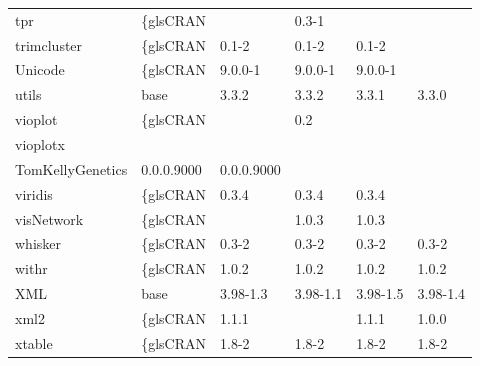 \begin{longtable}{llllll}
\rowcolor{black!10}
tpr                           & \{gls{CRAN}                      &             & 0.3-1       &                &                   \\
\rowcolor{black!5}
trimcluster                   & \{gls{CRAN}                      & 0.1-2       & 0.1-2       & 0.1-2          &                    \\
\rowcolor{black!10}
Unicode                       & \{gls{CRAN}                      & 9.0.0-1     & 9.0.0-1     & 9.0.0-1        &                   \\
\rowcolor{black!5}
utils                         & base                      & 3.3.2       & 3.3.2       & 3.3.1          & 3.3.0              \\
\rowcolor{black!10}
vioplot                       & \{gls{CRAN}                      &             & 0.2         &                &                   \\
\rowcolor{black!5}
vioplotx                      & \begin{tabular}[c]{@{}l@{}}GitHub \\ TomKellyGenetics \end{tabular}  & 0.0.0.9000  & 0.0.0.9000  &                &                    \\
\rowcolor{black!10}
viridis                       & \{gls{CRAN}                      & 0.3.4       & 0.3.4       & 0.3.4          &                   \\
\rowcolor{black!5}
visNetwork                    & \{gls{CRAN}                      &             & 1.0.3       & 1.0.3          &                    \\
\rowcolor{black!10}
whisker                       & \{gls{CRAN}                      & 0.3-2       & 0.3-2       & 0.3-2          & 0.3-2             \\
\rowcolor{black!5}
withr                         & \{gls{CRAN}                      & 1.0.2       & 1.0.2       & 1.0.2          & 1.0.2              \\
\rowcolor{black!10}
XML                           & base                      & 3.98-1.3    & 3.98-1.1    & 3.98-1.5       & 3.98-1.4          \\
\rowcolor{black!5}
xml2                          & \{gls{CRAN}                      & 1.1.1       &             & 1.1.1          & 1.0.0              \\
\rowcolor{black!10}
xtable                        & \{gls{CRAN}                      & 1.8-2       & 1.8-2       & 1.8-2          & 1.8-2             \\

\end{longtable}
